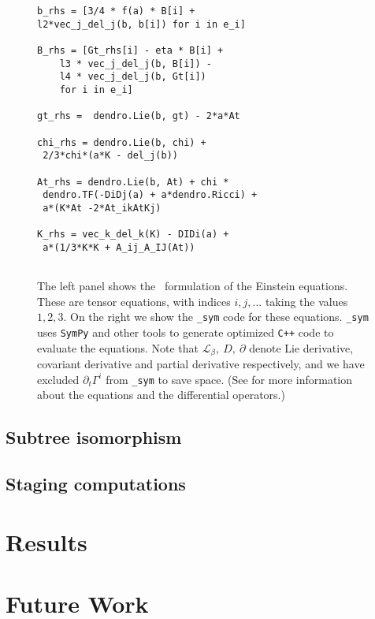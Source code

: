 \documentclass[10pt, conference]{IEEEtran} %
\begin{document}
\begin{figure*}[t]
\begin{minipage}[t]{.52\textwidth}
\begin{verbatim}
b_rhs = [3/4 * f(a) * B[i] + 
l2*vec_j_del_j(b, b[i]) for i in e_i]
		
B_rhs = [Gt_rhs[i] - eta * B[i] + 
	l3 * vec_j_del_j(b, B[i]) - 
	l4 * vec_j_del_j(b, Gt[i]) 
	for i in e_i]
		
gt_rhs =  dendro.Lie(b, gt) - 2*a*At

chi_rhs = dendro.Lie(b, chi) + 
 2/3*chi*(a*K - del_j(b)) 
		
At_rhs = dendro.Lie(b, At) + chi *
 dendro.TF(-DiDj(a) + a*dendro.Ricci) +
 a*(K*At -2*At_ikAtKj)
		
K_rhs = vec_k_del_k(K) - DIDi(a) +
 a*(1/3*K*K + A_ij_A_IJ(At)) 
		
\end{verbatim}
	\end{minipage}
	\caption{\label{fig:symb} The left panel shows the \BSSN ~formulation of the 
		Einstein equations. These are tensor equations, with indices $i,j,\ldots$
		taking the values $1, 2, 3$. On the right we show the \texttt{{\dendro\_sym}}
		code for these equations. \texttt{\dendro\_sym} uses \texttt{SymPy} and other tools
		to generate optimized \texttt{C++} code to evaluate the equations. Note that $\mathcal{L}_\beta,\ D,\ \partial$ denote Lie derivative, covariant derivative and partial derivative respectively, and we have excluded $\partial_t\Gamma^i$ from \texttt{\dendro\_sym} to save space. (See \cite{Baumgarte:1998te,Alcubierre:1138167} for more information about the equations and the differential operators.)}
	\label{fig:bssneqs}
	\vspace{-0.15in}
\end{figure*}

\subsection{Subtree isomorphism}

\subsection{Staging computations}


\section{Results}

\section{Future Work}






\end{document}
